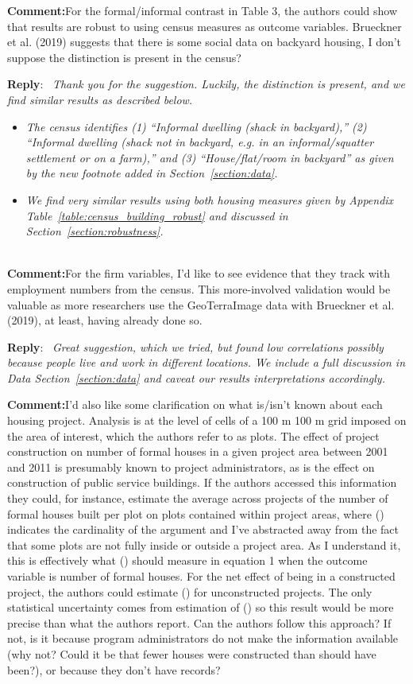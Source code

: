 \documentclass{article}
\newcommand{\reply}{\medskip \noindent \textbf{Reply}:\ \textit }
\newcommand{\sr}{\begin{minipage}{\dimexpr\textwidth-3cm}}
\newcommand{\er}{\end{minipage}}
\newcommand{\cc}{\medskip \noindent \textbf{Comment:}\hspace{2em}}
\begin{document}
\cc For the formal/informal contrast in Table 3, the authors could show that results are robust to using census measures as outcome variables. Brueckner et al. (2019) suggests that there is some social data on backyard housing, I don't suppose the distinction is present in the census? 

\sr
\reply{ Thank you for the suggestion.  Luckily, the distinction is present, and we find similar results as described below.}
\begin{itemize}
    \item \textit{ The census identifies (1) ``Informal dwelling (shack in backyard),'' (2) ``Informal dwelling (shack not in backyard, e.g. in an informal/squatter settlement or on a farm),'' and (3) ``House/flat/room in backyard'' as given by the new footnote added in Section~\ref{section:data}.   }
    \item \textit{We find very similar results using both housing measures given by Appendix Table~\ref{table:census_building_robust} and discussed in Section~\ref{section:robustness}.}
\end{itemize}
\er\\

\cc For the firm variables, I'd like to see evidence that they track with employment numbers from the census.  This more-involved validation would be valuable as more researchers use the GeoTerraImage data with Brueckner et al. (2019), at least, having already done so.

\sr
\reply{ Great suggestion, which we tried, but found low correlations possibly because people live and work in different locations.  We include a full discussion in Data Section~\ref{section:data} and caveat our results interpretations accordingly. }\\
\er

\cc I'd also like some clarification on what is/isn't known about each housing project. Analysis is at the level of cells of a 100 m  100 m grid imposed on the area of interest, which the authors refer to as plots. The effect of project construction on number of formal houses in a given project area between 2001 and 2011 is presumably known to project administrators, as is the effect on construction of public service buildings. If the authors accessed this information they could, for instance, estimate the average across projects of the number of formal houses built per plot on plots contained within project areas, where () indicates the cardinality of the argument and I've abstracted away from the fact that some plots are not fully inside or outside a project area. As I understand it, this is effectively what () should measure in equation 1 when the outcome variable is number of formal houses. For the net effect of being in a constructed project, the authors could estimate () for unconstructed projects. The only statistical uncertainty comes from estimation of () so this result would be more precise than what the authors report.  Can the authors follow this approach? If not, is it because program administrators do not make the information available (why not? Could it be that fewer houses were constructed than should have been?), or because they don't have records?  
\end{document}
